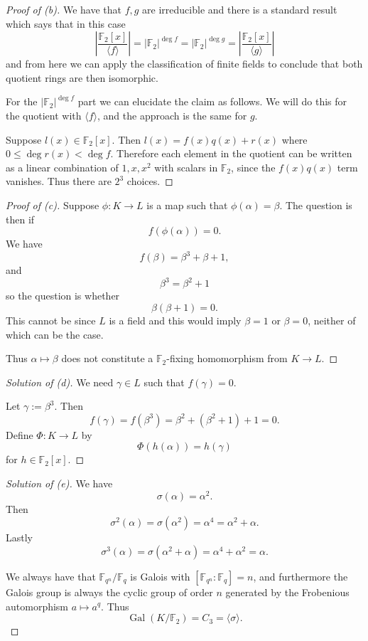 \begin{proof}[Proof of (b)]
    We have that $f,g$ are irreducible and there is a standard 
    result which says that in this case 
    \[
        \left|\frac{\mathbb F_2[x]}{\langle f \rangle}\right|
        = |\mathbb F_2|^{\deg f} 
        = |\mathbb F_2|^{\deg g} = 
        \left|\frac{\mathbb F_2[x]}{\langle g \rangle}\right|
    \]
    and from here we can apply the classification of finite fields 
    to conclude that both quotient rings are then isomorphic.

    For the $|\mathbb F_2|^{\deg f}$ part we can elucidate the 
    claim as follows. We will do this for the quotient with 
    $\langle f \rangle$, and the approach is the same for 
    $g$. 

    Suppose $l(x) \in \mathbb F_2[x]$. Then 
    $l(x) = f(x)q(x) + r(x)$ where $0 \leq \deg r(x) < \deg f$. 
    Therefore each element in the quotient can be written 
    as a linear combination of $1, x, x^2$ with scalars in 
    $\mathbb F_2$, since the $f(x)q(x)$ term vanishes. 
    Thus there are $2^3$ choices. 
\end{proof}

\begin{proof}[Proof of (c)]
    Suppose $\phi : K \to L$ is a map such that 
    $\phi(\alpha) = \beta$. 
    The question is then if 
    \[
        f(\phi(\alpha)) = 0. 
    \]
    We have 
    \[
        f(\beta) = \beta^3 + \beta + 1,
    \]
    and
    \[
        \beta^3 = \beta^2 + 1 
    \]
    so the question is whether 
    \[
        \beta(\beta + 1) = 0.  
    \]
    This cannot be since $L$ is a field and 
    this would imply $\beta = 1$ or 
    $\beta = 0$, neither of which can be the case. 

    Thus $\alpha \mapsto \beta$ does not 
    constitute a $\mathbb F_2$-fixing homomorphism from $K \to L$.
     
\end{proof}
\begin{proof}[Solution of (d)]
    We need $\gamma \in L$ such that 
    $f(\gamma) = 0$.

    Let $\gamma := \beta^3$. 
    Then 
    \[
        f(\gamma) 
        = f(\beta^3) 
        = \beta^2 + (\beta^2 + 1) + 1 
        = 0.
    \]
    Define $\Phi : K \to L$ by 
    \[
        \Phi(h(\alpha)) = h(\gamma)
    \]
    for $h \in \mathbb F_2[x]$.
\end{proof}
\begin{proof}[Solution of (e)]
    We have 
    \[
        \sigma(\alpha) = \alpha^2.
    \]
    Then 
    \[
        \sigma^2(\alpha) = 
        \sigma(\alpha^2) = \alpha^4  
        = \alpha^2 + \alpha.
    \]
    Lastly 
    \[
        \sigma^3(\alpha) 
        = \sigma(\alpha^2 + \alpha) 
        = \alpha^4 + \alpha^2 
        = \alpha. 
    \]

    We always have that 
    $\mathbb F_{q^n} / \mathbb F_{q}$ is Galois 
    with $[\mathbb F_{q^n} : \mathbb F_q] = n$, 
    and furthermore the Galois group is 
    always the cyclic group of order $n$ generated 
    by the Frobenious automorphism $a \mapsto a^q$. 
    Thus 
    \[
        \operatorname{Gal}(K/\mathbb F_2) 
        = C_3 = \langle \sigma \rangle.
    \]
\end{proof}

